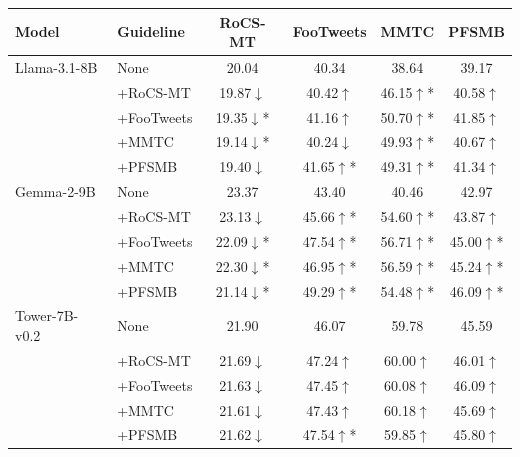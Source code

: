 \begin{tabular}{llcccc}
\toprule
Model & Guideline & RoCS-MT & FooTweets & MMTC & PFSMB \\
\midrule
Llama-3.1-8B & None & 20.04 & 40.34 & 38.64 & 39.17 \\
 & +RoCS-MT & 19.87\colorbox{myred}{$\downarrow$} & 40.42\colorbox{mygreen}{$\uparrow$} & 46.15\colorbox{mygreen}{$\uparrow$}* & 40.58\colorbox{mygreen}{$\uparrow$} \\
 & +FooTweets & 19.35\colorbox{myred}{$\downarrow$}* & 41.16\colorbox{mygreen}{$\uparrow$} & 50.70\colorbox{mygreen}{$\uparrow$}* & 41.85\colorbox{mygreen}{$\uparrow$} \\
 & +MMTC & 19.14\colorbox{myred}{$\downarrow$}* & 40.24\colorbox{myred}{$\downarrow$} & 49.93\colorbox{mygreen}{$\uparrow$}* & 40.67\colorbox{mygreen}{$\uparrow$} \\
 & +PFSMB & 19.40\colorbox{myred}{$\downarrow$} & 41.65\colorbox{mygreen}{$\uparrow$}* & 49.31\colorbox{mygreen}{$\uparrow$}* & 41.34\colorbox{mygreen}{$\uparrow$} \\
Gemma-2-9B & None & 23.37 & 43.40 & 40.46 & 42.97 \\
 & +RoCS-MT & 23.13\colorbox{myred}{$\downarrow$} & 45.66\colorbox{mygreen}{$\uparrow$}* & 54.60\colorbox{mygreen}{$\uparrow$}* & 43.87\colorbox{mygreen}{$\uparrow$} \\
 & +FooTweets & 22.09\colorbox{myred}{$\downarrow$}* & 47.54\colorbox{mygreen}{$\uparrow$}* & 56.71\colorbox{mygreen}{$\uparrow$}* & 45.00\colorbox{mygreen}{$\uparrow$}* \\
 & +MMTC & 22.30\colorbox{myred}{$\downarrow$}* & 46.95\colorbox{mygreen}{$\uparrow$}* & 56.59\colorbox{mygreen}{$\uparrow$}* & 45.24\colorbox{mygreen}{$\uparrow$}* \\
 & +PFSMB & 21.14\colorbox{myred}{$\downarrow$}* & 49.29\colorbox{mygreen}{$\uparrow$}* & 54.48\colorbox{mygreen}{$\uparrow$}* & 46.09\colorbox{mygreen}{$\uparrow$}* \\
Tower-7B-v0.2 & None & 21.90 & 46.07 & 59.78 & 45.59 \\
 & +RoCS-MT & 21.69\colorbox{myred}{$\downarrow$} & 47.24\colorbox{mygreen}{$\uparrow$} & 60.00\colorbox{mygreen}{$\uparrow$} & 46.01\colorbox{mygreen}{$\uparrow$} \\
 & +FooTweets & 21.63\colorbox{myred}{$\downarrow$} & 47.45\colorbox{mygreen}{$\uparrow$} & 60.08\colorbox{mygreen}{$\uparrow$} & 46.09\colorbox{mygreen}{$\uparrow$} \\
 & +MMTC & 21.61\colorbox{myred}{$\downarrow$} & 47.43\colorbox{mygreen}{$\uparrow$} & 60.18\colorbox{mygreen}{$\uparrow$} & 45.69\colorbox{mygreen}{$\uparrow$} \\
 & +PFSMB & 21.62\colorbox{myred}{$\downarrow$} & 47.54\colorbox{mygreen}{$\uparrow$}* & 59.85\colorbox{mygreen}{$\uparrow$} & 45.80\colorbox{mygreen}{$\uparrow$} \\
\bottomrule
\end{tabular}

